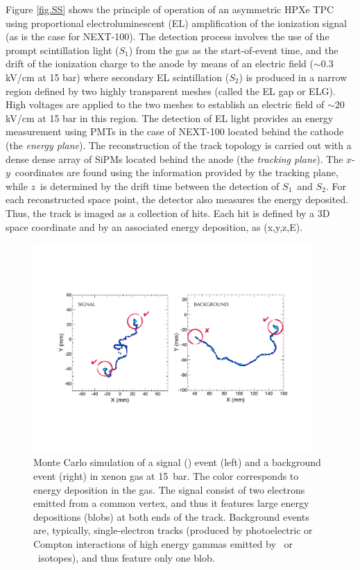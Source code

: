 \documentclass{JINST}
\begin{document}
Figure \ref{fig.SS} shows the principle of operation of an asymmetric HPXe TPC using proportional electroluminescent (EL) amplification of the ionization signal (as is the case for NEXT-100). The detection process involves the use of the prompt scintillation light ($S_1$) from the gas as the start-of-event time, and the drift of the ionization charge to the anode by means of an electric field ($\sim0.3$ kV/cm at 15 bar) where secondary EL scintillation ($S_2$) is produced in a narrow region defined by two highly transparent meshes (called the EL gap or ELG).  High voltages are applied to the two meshes to establish an electric field of $\sim20$ kV/cm at 15 bar in this region. The detection of EL light provides an energy measurement using PMTs in the case of NEXT-100 located behind the cathode (the \emph{energy plane}). The reconstruction of the track topology is carried out with a dense dense array of SiPMs located behind the anode (the \emph{tracking plane}). The $x$-$y$~coordinates are found using the information provided by the tracking plane, while $z$~is determined by the drift time between the detection of $S_1$~and $S_2$. For each reconstructed space point, the detector also measures the energy deposited. Thus, the track is imaged as a collection of hits. Each hit is defined by a 3D space coordinate and by an associated energy deposition, as (x,y,z,E).

\begin{figure}[!htb]
\centering
\includegraphics[width= 0.95\textwidth]{img/TrackSignature.pdf}
\caption{Monte Carlo simulation of a signal (\bbonu) event (left) and a  background event (right) in xenon gas at 15~bar. The color corresponds to energy deposition in the gas. The signal consist of two electrons emitted from a common vertex, and thus it features large energy depositions  (blobs) at both ends of the track. Background events are, typically, single-electron tracks (produced by photoelectric or Compton interactions of high energy gammas emitted by \BI\ or \TL\ isotopes), and thus feature only one blob.} \label{fig.ETRK2}
\end{figure}
\end{document}
